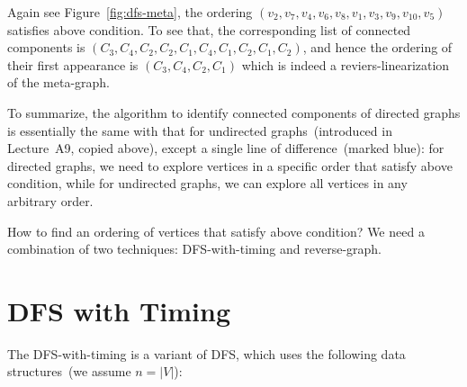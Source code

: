 Again see Figure~\ref{fig:dfs-meta}, the ordering 
$( v_{2} ,v_{7} ,v_{4} ,v_{6} ,v_{8} ,v_{1} ,v_{3} ,v_{9} ,v_{10} ,v_{5})$ satisfies above condition.
To see that, the corresponding list of connected components is 
$(C_3, C_4, C_2, C_2, C_1, C_4, C_1, C_2, C_1, C_2)$,
and hence the ordering of their first appearance is $(C_3, C_4, C_2, C_1)$ which is indeed a reviers-linearization of the meta-graph.

\begin{minipage}{0.8\textwidth}
	\xxx
	\xxx
	\xxx
	\xxx
	\xxx
	\xxx
	\xxx
	\xxx
	\xxx
\end{minipage}

\begin{minipage}{0.8\textwidth}
	\xxx
	\xxx
	\xxx
	\xxx
	\xxx
	\xxx
\end{minipage}

To summarize, the algorithm to identify connected components of directed graphs
is essentially the same with that for undirected graphs~(introduced in Lecture~A9, copied above), 
except a single line of difference~(marked blue): for directed graphs,
we need to explore vertices in a specific order that satisfy above condition,
while for undirected graphs, we can explore all vertices in any arbitrary order.

How to find an ordering of vertices that satisfy above condition?
We need a combination of two techniques: DFS-with-timing and reverse-graph.

\section*{DFS with Timing}

The DFS-with-timing is a variant of DFS, which uses the following
data structures~(we assume $n = |V|$):

